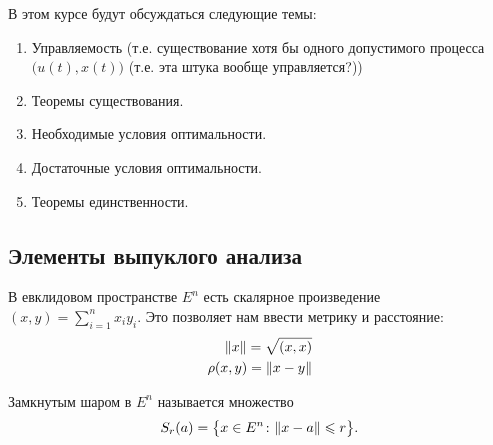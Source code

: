 \vspace{1cm}
В этом курсе будут обсуждаться следующие темы:
\begin{enumerate}
    \item Управляемость (т.е. существование хотя бы одного допустимого процесса $\bigl(u(t), x(t)\bigr)$ (т.е. эта штука вообще управляется?))
    \item Теоремы существования.
    \item Необходимые условия оптимальности.
    \item Достаточные условия оптимальности.
    \item Теоремы единственности.
\end{enumerate}

\subsection{Элементы выпуклого анализа}

В евклидовом пространстве $E^n$ есть скалярное произведение $(x, y) = \sum\limits_{i = 1}^{n} x_i y_i$.
Это позволяет нам ввести метрику и расстояние:
\begin{align}
    \lVert x \rVert = \sqrt{(x,x)} \\
    \rho(x, y) = \lVert x-y \rVert
\end{align}

\begin{defn}
    \label{lection2:ball}
    Замкнутым шаром в $E^n$ называется множество
    \begin{equation}
        S_r(a) = \bigl\{ x \in E^n \colon \lVert x - a \rVert \leqslant r \bigr\}.
    \end{equation}
\end{defn}


